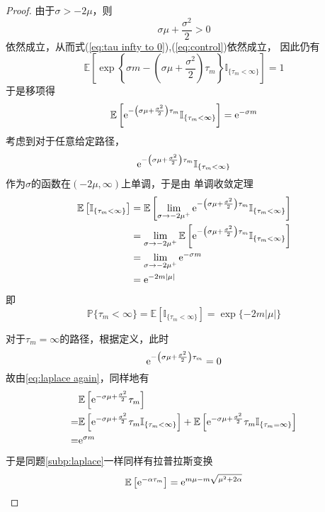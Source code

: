 \documentclass[cn]{homework}
\newcommand{\E}{\mathbb E}
\begin{document}
\begin{subproblem}
        \item
        \begin{proof}
            由于$\sigma>-2\mu$，则
            \[\sigma\mu+\frac{\sigma^2}{2}>0\]
            依然成立，从而式(\ref{eq:tau infty to 0}),(\ref{eq:control})依然成立，
            因此仍有
            \[\E\left[
                \exp\left\{
                    \sigma m-\left(\sigma\mu+\frac{\sigma^2}{2}\right)\tau_m
                    \right\}
                \mathbb I_{\{\tau_m<\infty\}}
            \right]=1\]
            于是移项得
            \begin{equation}
                \label{eq:laplace again}
                \E\left[\e^{-\left(\sigma\mu+\frac{\sigma^2}{2}\right)\tau_m}
                \mathbb I_{\{\tau_m<\infty\}}\right]
                =\e^{-\sigma m}
            \end{equation}
            考虑到对于任意给定路径，
            \[\mathrm e^{-\left(\sigma\mu+\frac{\sigma^2}{2}\right)\tau_m}
            \mathbb I_{\{\tau_m<\infty\}}\]
            作为$\sigma$的函数在$(-2\mu,\infty)$上单调，于是由
            单调收敛定理
            \[\begin{aligned}
                \E\left[\mathbb I_{\{\tau_m<\infty\}}\right]
                &=
                \E\left[
                \lim_{\sigma\to -2\mu^+}
                \e^{-\left(\sigma\mu+\frac{\sigma^2}{2}\right)\tau_m}
                \mathbb I_{\{\tau_m<\infty\}}
                \right]\\
                &=\lim_{\sigma\to -2\mu^+}
                \E\left[
                \e^{-\left(\sigma\mu+\frac{\sigma^2}{2}\right)\tau_m}
                \mathbb I_{\{\tau_m<\infty\}}
                \right]\\
                &=\lim_{\sigma\to -2\mu^+}\e^{-\sigma m}\\
                &=\e^{-2m|\mu|}
            \end{aligned}\]
            即
            \[\mathbb P\{\tau_m<\infty\}
            =\E\left[\mathbb I_{\{\tau_m<\infty\}}\right]
            =\exp\{-2m|\mu|\}\]

            对于$\tau_m=\infty$的路径，根据定义，此时
            \[\mathrm e^{-\left(\sigma\mu+\frac{\sigma^2}{2}\right)\tau_m}
            =0\]
            故由\cref{eq:laplace again}，同样地有
            \[\begin{aligned}
                &\E\left[\e^{-\sigma\mu+\frac{\sigma^2}{2}}\tau_m\right]\\
            =&\E\left[\e^{-\sigma\mu+\frac{\sigma^2}{2}}\tau_m\mathbb I_{\{\tau_m<\infty\}}\right]
            +\E\left[\e^{-\sigma\mu+\frac{\sigma^2}{2}}\tau_m\mathbb I_{\{\tau_m=\infty\}}\right]\\
            =&\e^{\sigma m}
            \end{aligned}\]
            于是同题\ref{subp:laplace}一样同样有拉普拉斯变换
            \[\E\left[\e^{-\alpha\tau_m}\right]
            =\e^{m\mu-m\sqrt{\mu^2+2\alpha}}\]
        \end{proof}
    \end{subproblem}
\end{document}
